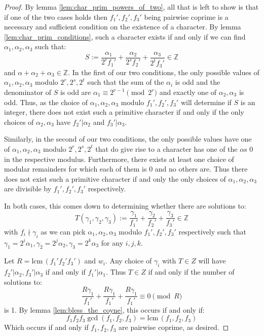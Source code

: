 \documentclass{article}
\newcommand{\Z}{\mathbb{Z}}
\newcommand{\lcm}[0]{\mathrm{lcm} \,}
\theoremstyle{definition}
\theoremstyle{definition}
\theoremstyle{remark}
\begin{document}
\begin{proof} By lemma \ref{lem:char_prim_powers_of_two}, all that is left to show is that if one of the two cases holds then $f_1', f_2', f_3'$ being pairwise coprime is a necessary and sufficient condition on the existence of a character. By lemma \ref{lem:char_prim_conditions}, such a character exists if and only if we can find $\alpha_1, \alpha_2, \alpha_3$ such that:
\[S := \frac{\alpha_1}{2^rf_1'} + \frac{\alpha_2}{2^sf_2'} + \frac{\alpha_3}{2^tf_3'} \in \Z\]
and $\alpha+\alpha_2+\alpha_3 \in \Z$. In the first of our two conditions, the only possible values of $\alpha_1, \alpha_2, \alpha_3$ modulo $2^r, 2^s, 2^t$ such that the sum of the $\alpha_i$ is odd and the denominator of $S$ is odd are $\alpha_1 \equiv 2^{r-1} \pmod{2^r}$ and exactly one of $\alpha_2, \alpha_3$ is odd. Thus, as the choice of $\alpha_1, \alpha_2, \alpha_3$ modulo $f_1', f_2', f_3'$ will determine if $S$ is an integer,  there does not exist such a primitive character if and only if the only choices of $\alpha_2, \alpha_3$ have $f_2' | \alpha_2$ and $f_3' | \alpha_3$.
\par
Similarly, in the second of our two conditions, the only possible values have one of $\alpha_1, \alpha_2, \alpha_3$ modulo $2^r, 2^s, 2^t$ that do  give rise to a character has one of the $\alpha$s 0 in the respective modulus. Furthermore, there exists at least one choice of modular remainders for which each of them is 0 and no others are. Thus there does not exist such a primitive character if and only the only choices of $\alpha_1, \alpha_2, \alpha_3$ are divisible by $f_1', f_2', f_3'$ respectively.
\par
In both cases, this comes down to determining whether there are solutions to:
\[T(\gamma_1, \gamma_2, \gamma_3) := \frac{\gamma_1}{f_1'} + \frac{\gamma_2}{f_2'} + \frac{\gamma_3}{f_3'} \in \Z\]
with $f_i \nmid \gamma_i$ as we can pick $\alpha_1, \alpha_2, \alpha_3$ modulo $f_1', f_2', f_3'$ respectively such that $\gamma_1 = 2^{i}\alpha_1, \gamma_2 = 2^j\alpha_2, \gamma_3 = 2^k\alpha_3$ for any $i,j,k$. 
\par
Let $R = \lcm(f_1'f_2'f_3')$ and $w_i$. Any choice of $\gamma_i$ with $T \in Z$ will have $f_2' | \alpha_2, f_3' | \alpha_3$ if and only if  $f_1' | \alpha_1$. Thus $T \in Z$ if and only if the number of solutions to:
\[\frac{R\gamma_1}{f_1'} + \frac{R\gamma_1}{f_1'} + \frac{R\gamma_1}{f_1'}  \equiv 0 \pmod{R}\]
is 1. By lemma \ref{lem:bless_the_coyne}, this occurs if and only if:
\[f_1f_2f_3\gcd(f_1,f_2,f_3) = \lcm(f_1,f_2,f_3)\]
Which occurs if and only if $f_1, f_2, f_3$ are pairwise coprime, as desired.
\end{proof}
\end{document}
